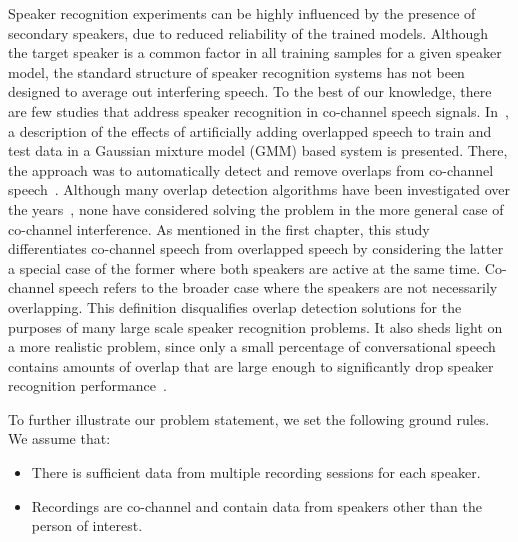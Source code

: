 Speaker recognition experiments can be highly influenced by the presence of secondary speakers, due to reduced reliability of the trained models. 
Although the target speaker is a common factor in all training samples for a given speaker model, the standard structure of speaker recognition systems has not been designed to average out interfering speech. 
To the best of our knowledge, there are few studies that address speaker recognition in co-channel speech signals. 
In~\cite{yantorno_report,yantorno_SID}, a description of the effects of artificially adding overlapped speech to train and test data in a Gaussian mixture model (GMM) based system is presented. 
There, the approach was to automatically detect and remove overlaps from co-channel speech~\cite{yantorno_SID}. 
Although many overlap detection algorithms have been investigated over the years~\cite{nav_icassp13,smolenski_tut,sapvr_2000}, none have considered solving the problem in the more general case of co-channel interference. 
As mentioned in the first chapter, this study differentiates co-channel speech from overlapped speech by considering the latter a special case of the former where both speakers are active at the same time. 
Co-channel speech refers to the broader case where the speakers are not necessarily overlapping.   
This definition disqualifies overlap detection solutions for the purposes of many large scale speaker recognition problems. 
It also sheds light on a more realistic problem, since only a small percentage of conversational speech contains amounts of overlap that are large enough to significantly drop speaker recognition performance~\cite{cetin_shriberg_06_icassp,smolenski_tut}. 

%

To further illustrate our problem statement, we set the following ground rules. We assume that:
\begin{itemize}
	\item There is sufficient data from multiple recording sessions for each speaker. 
	\item Recordings are co-channel and contain data from speakers other than the person of interest.
\end{itemize} 

